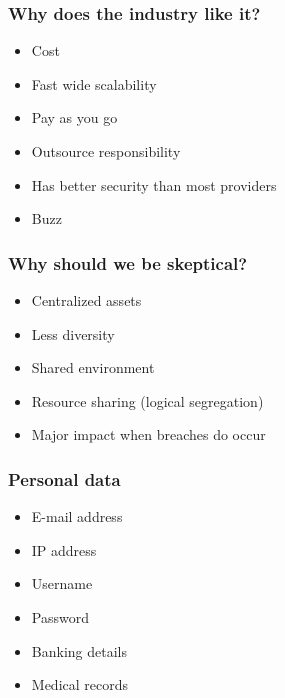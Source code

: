 \documentclass{beamer}
\begin{document}
\begin{frame}
    \frametitle{Why does the industry like it?}
    \begin{itemize}
    \item Cost
    \item Fast wide scalability
    \item Pay as you go
    \item Outsource responsibility
    \item Has better security than most providers
    \item Buzz
    \end{itemize}
\end{frame}

\begin{frame}
    \frametitle{Why should we be skeptical?}
    \begin{itemize}
      \item Centralized assets
      \item Less diversity
      \item Shared environment
      \item Resource sharing (logical segregation)
      \item Major impact when breaches do occur
    \end{itemize}
\end{frame}

\begin{frame}
    \frametitle{Personal data}
    \begin{itemize}
      \item E-mail address
      \item IP address
      \item Username
      \item Password
      \item Banking details
      \item Medical records
    \end{itemize}
\end{frame}
\end{document}

